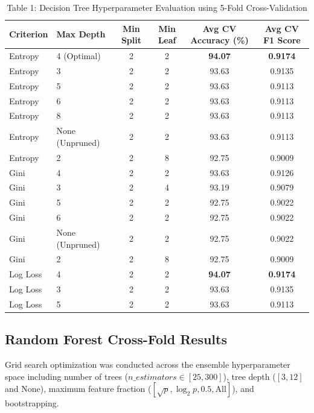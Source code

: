 \documentclass[12pt,a4paper]{article}
\begin{document}
\begin{table}[H]
\centering
\small
\begin{tabular}{llcccc}
\toprule
\textbf{Criterion} & \textbf{Max Depth} & \textbf{Min Split} & \textbf{Min Leaf} & \textbf{Avg CV Accuracy (\%)} & \textbf{Avg CV F1 Score} \\
\midrule
Entropy & 4 (Optimal) & 2 & 2 & \textbf{94.07} & \textbf{0.9174} \\
Entropy & 3 & 2 & 2 & 93.63 & 0.9135 \\
Entropy & 5 & 2 & 2 & 93.63 & 0.9113 \\
Entropy & 6 & 2 & 2 & 93.63 & 0.9113 \\
Entropy & 8 & 2 & 2 & 93.63 & 0.9113 \\
Entropy & None (Unpruned) & 2 & 2 & 93.63 & 0.9113 \\
Entropy & 2 & 2 & 8 & 92.75 & 0.9009 \\
\midrule
Gini & 4 & 2 & 2 & 93.63 & 0.9126 \\
Gini & 3 & 2 & 4 & 93.19 & 0.9079 \\
Gini & 5 & 2 & 2 & 92.75 & 0.9022 \\
Gini & 6 & 2 & 2 & 92.75 & 0.9022 \\
Gini & None (Unpruned) & 2 & 2 & 92.75 & 0.9022 \\
Gini & 2 & 2 & 8 & 92.75 & 0.9009 \\
\midrule
Log Loss & 4 & 2 & 2 & \textbf{94.07} & \textbf{0.9174} \\
Log Loss & 3 & 2 & 2 & 93.63 & 0.9135 \\
Log Loss & 5 & 2 & 2 & 93.63 & 0.9113 \\
\bottomrule
\end{tabular}
\caption{Table 1: Decision Tree Hyperparameter Evaluation using 5-Fold Cross-Validation}
\end{table}

\subsection{Random Forest Cross-Fold Results}
Grid search optimization was conducted across the ensemble hyperparameter space including number of trees ($n\_estimators \in [25, 300]$), tree depth ($[3, 12]$ and None), maximum feature fraction ($[\sqrt{p}, \log_2 p, 0.5, \text{All}]$), and bootstrapping.
\end{document}
